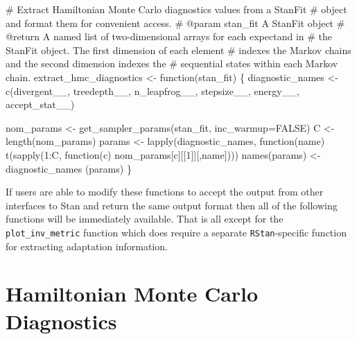 \documentclass[
  letterpaper,
  DIV=11,
  numbers=noendperiod]{scrartcl}
\newenvironment{Shaded}{\begin{snugshade}}{\end{snugshade}}
\newcommand{\CommentTok}[1]{\textcolor[rgb]{0.37,0.37,0.37}{#1}}
\newcommand{\DecValTok}[1]{\textcolor[rgb]{0.68,0.00,0.00}{#1}}
\newcommand{\NormalTok}[1]{\textcolor[rgb]{0.00,0.23,0.31}{#1}}
\newcommand{\OperatorTok}[1]{\textcolor[rgb]{0.37,0.37,0.37}{#1}}
\newcommand{\StringTok}[1]{\textcolor[rgb]{0.13,0.47,0.30}{#1}}
\begin{document}
\begin{Shaded}
\begin{Highlighting}[]
\CommentTok{\# Extract Hamiltonian Monte Carlo diagnostics values from a StanFit}
\CommentTok{\# object and format them for convenient access.}
\CommentTok{\# @param stan\_fit A StanFit object}
\CommentTok{\# @return A named list of two{-}dimensional arrays for each expectand in }
\CommentTok{\#         the StanFit object.  The first dimension of each element }
\CommentTok{\#         indexes the Markov chains and the second dimension indexes the }
\CommentTok{\#         sequential states within each Markov chain. }
\NormalTok{extract\_hmc\_diagnostics }\OperatorTok{\textless{}{-}}\NormalTok{ function(stan\_fit) \{}
\NormalTok{  diagnostic\_names }\OperatorTok{\textless{}{-}}\NormalTok{ c(}\StringTok{\textquotesingle{}divergent\_\_\textquotesingle{}}\NormalTok{, }\StringTok{\textquotesingle{}treedepth\_\_\textquotesingle{}}\NormalTok{, }\StringTok{\textquotesingle{}n\_leapfrog\_\_\textquotesingle{}}\NormalTok{, }
                        \StringTok{\textquotesingle{}stepsize\_\_\textquotesingle{}}\NormalTok{, }\StringTok{\textquotesingle{}energy\_\_\textquotesingle{}}\NormalTok{, }\StringTok{\textquotesingle{}accept\_stat\_\_\textquotesingle{}}\NormalTok{)}

\NormalTok{  nom\_params }\OperatorTok{\textless{}{-}}\NormalTok{ get\_sampler\_params(stan\_fit, inc\_warmup}\OperatorTok{=}\NormalTok{FALSE)}
\NormalTok{  C }\OperatorTok{\textless{}{-}}\NormalTok{ length(nom\_params)}
\NormalTok{  params }\OperatorTok{\textless{}{-}}\NormalTok{ lapply(diagnostic\_names, }
\NormalTok{                   function(name) t(sapply(}\DecValTok{1}\NormalTok{:C, function(c) }
\NormalTok{                                  nom\_params[c][[}\DecValTok{1}\NormalTok{]][,name])))}
\NormalTok{  names(params) }\OperatorTok{\textless{}{-}}\NormalTok{ diagnostic\_names}
\NormalTok{  (params)}
\NormalTok{\}}
\end{Highlighting}
\end{Shaded}

If users are able to modify these functions to accept the output from
other interfaces to Stan and return the same output format then all of
the following functions will be immediately available. That is all
except for the \texttt{plot\_inv\_metric} function which does require a
separate \texttt{RStan}-specific function for extracting adaptation
information.

\section{Hamiltonian Monte Carlo
Diagnostics}\label{hamiltonian-monte-carlo-diagnostics}
\end{document}
